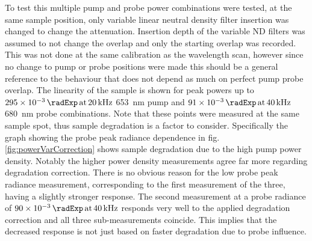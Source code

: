 \documentclass[twoside,openright]{scrreprt}
\def\pumpExp#1{\ensuremath{\SI{#1}{\radExp}\,\mathrm{at}\, \SI{20}{\kilo\hertz}}}
\def\probeExp#1{\ensuremath{\SI{#1}{\radExp}\,\mathrm{at}\, \SI{40}{\kilo\hertz}}}
\begin{document}
{To test this multiple pump and probe power combinations were tested, at the same sample position, only variable linear neutral density filter insertion was changed to change the attenuation. Insertion depth of the variable ND filters was assumed to not change the overlap and only the starting overlap was recorded. This was not done at the same calibration as the wavelength scan, however since no change to pump or probe positions were made this should be a general reference to the behaviour that does not depend as much on perfect pump probe overlap. The linearity of the sample is shown for peak powers up to \pumpExp{295e-3} \SI{653}{\nano\meter} pump and \probeExp{91e-3} \SI{680}{\nano\meter} probe combinations. Note that these points were measured at the same sample spot, thus sample degradation is a factor to consider. Specifically the graph showing the probe peak radiance dependence in fig. \ref{fig:powerVarCorrection} shows sample degradation due to the high pump power density. Notably the higher power density measurements agree far more regarding degradation correction. There is no obvious reason for the low probe peak radiance measurement, corresponding to the first measurement of the three, having a slightly stronger response. The second measurement at a probe radiance of \probeExp{90e-3} responds very well to the applied degradation correction and all three sub-measurements coincide. This implies that the decreased response is not just based on faster degradation due to probe influence.

}
\end{document}
